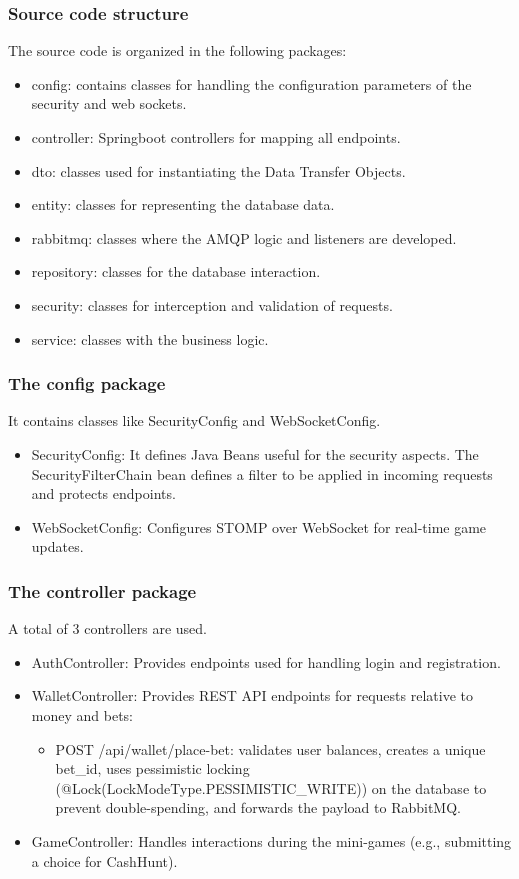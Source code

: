 \documentclass[12pt,a4paper]{article}
\begin{document}
\subsubsection{Source code structure}
The source code is organized in the following packages:
\begin{itemize}
    \item config: contains classes for handling the configuration parameters of the security and web sockets.
    \item controller: Springboot controllers for mapping all endpoints.
    \item dto: classes used for instantiating the Data Transfer Objects.
    \item entity: classes for representing the database data.
    \item rabbitmq: classes where the AMQP logic and listeners are developed.
    \item repository: classes for the database interaction.
    \item security: classes for interception and validation of requests.
    \item service: classes with the business logic.
\end{itemize}

\subsubsection{The config package}
It contains classes like SecurityConfig and WebSocketConfig.
\begin{itemize}
    \item SecurityConfig: It defines Java Beans useful for the security aspects. The SecurityFilterChain bean defines a filter to be applied in incoming requests and protects endpoints.
    \item WebSocketConfig: Configures STOMP over WebSocket for real-time game updates.
\end{itemize}

\subsubsection{The controller package}
A total of 3 controllers are used.
\begin{itemize}
    \item AuthController: Provides endpoints used for handling login and registration.
    \item WalletController: Provides REST API endpoints for requests relative to money and bets:
    \begin{itemize}
        \item POST /api/wallet/place-bet: validates user balances, creates a unique bet\_id, uses pessimistic locking (@Lock(LockModeType.PESSIMISTIC\_WRITE)) on the database to prevent double-spending, and forwards the payload to RabbitMQ.
    \end{itemize}
    \item GameController: Handles interactions during the mini-games (e.g., submitting a choice for CashHunt).
\end{itemize}
\end{document}
